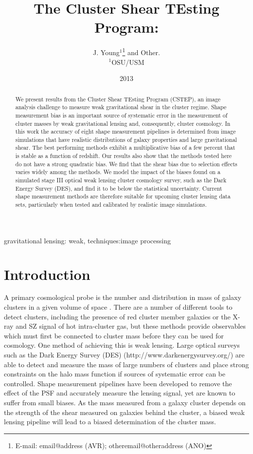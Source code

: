 \documentclass[useAMS,usenatbib]{mn2e}
\title[Cluster Shear TEsting Program]{The Cluster Shear TEsting Program: \green{a catchy subtitle here}}
\author[J. Young et al. ]{J. Young$^{1}$\thanks{E-mail:
email@address (AVR); otheremail@otheraddress (ANO)} and 
Other.\\
$^{1}$OSU/USM \\
}
\begin{document}
\date{2013}

\pagerange{\pageref{firstpage}--\pageref{lastpage}} 

\maketitle

\label{firstpage}

\begin{abstract}
We present results from the Cluster Shear TEsting Program (CSTEP), an image
analysis challenge to measure weak gravitational shear in
the cluster regime. Shape measurement bias is an important source of systematic error in the 
measurement of cluster masses by weak gravitational lensing and,
consequently, cluster cosmology. In this work the accuracy of eight shape measurement pipelines is determined from image simulations
that have realistic distributions of galaxy properties and large gravitational shear. The best
performing methods exhibit a multiplicative bias of a few percent that
is stable as a function of redshift. Our results also show that the
methods tested here do not have a strong quadratic bias. We find
that the shear bias due to selection effects varies widely
among the methods. We model the impact of the
biases found on a simulated stage III optical weak lensing cluster cosmology survey, such as the Dark Energy Survey (DES), and find it to
be below the statistical uncertainty. Current shape measurement methods are therefore suitable for upcoming cluster lensing data sets, particularly when tested and calibrated by realistic image simulations.
\end{abstract}

\begin{keywords}
gravitational lensing: weak, techniques:image processing
\end{keywords}


\section{Introduction}
A primary cosmological probe is the number and distribution in mass of galaxy
clusters in a given volume of space \citep[cf.][for a recent review]{Allen}. There are a number
of different tools to detect clusters, including the presence of red cluster member galaxies or the X-ray and SZ signal of hot intra-cluster gas, but these
methods provide observables which must first be connected to cluster mass before they can be used for cosmology. One method of achieving this is 
weak lensing. Large optical surveys such as the Dark Energy Survey (DES)
(http://www.darkenergysurvey.org/) are able to detect and measure the
mass of large numbers of clusters and place strong constraints on the
halo mass function if sources of systematic error can be controlled.
Shape measurement pipelines have been developed to remove the 
effect of the PSF and accurately measure the lensing signal, yet are known
to suffer from small biases. As the mass measured from a galaxy cluster depends on the strength of the
shear measured on galaxies behind the cluster, a biased weak lensing
pipeline will lead to a biased determination of the cluster mass.
 
\end{document}
